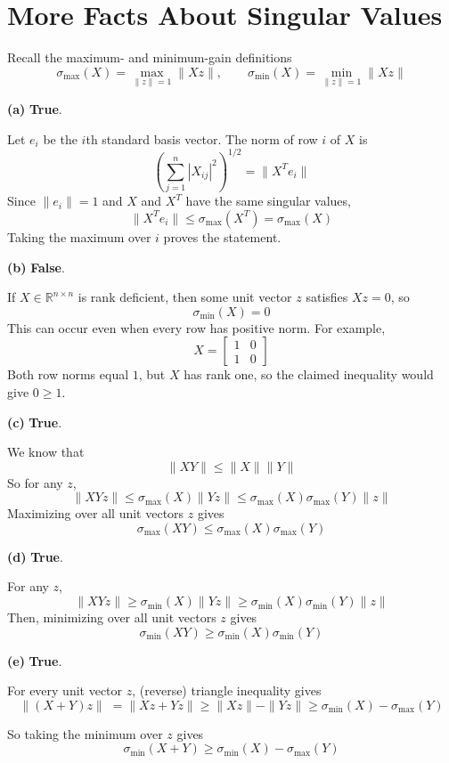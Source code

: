 \section{More Facts About Singular Values}

Recall the maximum- and minimum-gain definitions
\[
\sigma_{\max}(X)=\max_{\|z\|=1}\|Xz\|,
\qquad
\sigma_{\min}(X)=\min_{\|z\|=1}\|Xz\|
\]

\textbf{(a)}
\textbf{True}.

Let \(e_i\) be the \(i\)th standard basis vector. The norm of
row \(i\) of \(X\) is
\[
\left(\sum_{j=1}^n |X_{ij}|^2\right)^{1/2}
=\|X^Te_i\|
\]
Since \(\|e_i\|=1\) and \(X\) and \(X^T\) have the same singular values,
\[
\|X^Te_i\|\leq\sigma_{\max}(X^T)=\sigma_{\max}(X)
\]
Taking the maximum over \(i\) proves the statement.

\textbf{(b)}
\textbf{False}.

If \(X\in\mathbb{R}^{n\times n}\) is rank deficient, then
some unit vector \(z\) satisfies \(Xz=0\), so
\[
\sigma_{\min}(X)=0
\]
This can occur even when every row has positive norm. For example,
\[
X=
\begin{bmatrix}
1&0\\
1&0
\end{bmatrix}
\]
Both row norms equal \(1\), but \(X\) has rank one, so the claimed
inequality would give \(0\geq1\).

\textbf{(c)}
\textbf{True}.

We know that
\[
\|XY\|
\leq\|X\|\|Y\|
\]
So for any \(z\),
\[
\|XYz\|
\leq\sigma_{\max}(X)\|Yz\|
\leq\sigma_{\max}(X)\sigma_{\max}(Y)\|z\|
\]
Maximizing over all unit vectors \(z\) gives
\[
\boxed{\sigma_{\max}(XY)
\leq\sigma_{\max}(X)\sigma_{\max}(Y)}
\]

\textbf{(d)}
\textbf{True}.

For any \(z\),
\[
\|XYz\|
\geq\sigma_{\min}(X)\|Yz\|
\geq\sigma_{\min}(X)\sigma_{\min}(Y)\|z\|
\]
Then, minimizing over all unit vectors \(z\) gives
\[
\boxed{\sigma_{\min}(XY)
\geq\sigma_{\min}(X)\sigma_{\min}(Y)}
\]

\textbf{(e)}
\textbf{True}.

For every unit vector \(z\), (reverse) triangle inequality
gives
\[
\|(X+Y)z\|
\;=\|Xz+Yz\|
\geq\|Xz\|-\|Yz\|
\geq\sigma_{\min}(X)-\sigma_{\max}(Y)
\]

So taking the minimum over \(z\) gives
\[
\boxed{\sigma_{\min}(X+Y)
\geq\sigma_{\min}(X)-\sigma_{\max}(Y)}
\]
